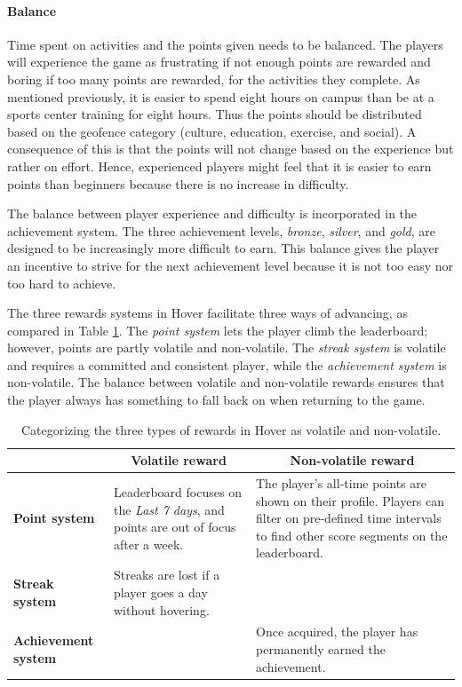 \paragraph*{Balance} 
Time spent on activities and the points given needs to be balanced. The players will experience the game as frustrating if not enough points are rewarded and boring if too many points are rewarded, for the activities they complete. As mentioned previously, it is easier to spend eight hours on campus than be at a sports center training for eight hours. Thus the points should be distributed based on the geofence category (culture, education, exercise, and social). A consequence of this is that the points will not change based on the experience but rather on effort. Hence, experienced players might feel that it is easier to earn points than beginners because there is no increase in difficulty.

The balance between player experience and difficulty is incorporated in the achievement system. The three achievement levels, \textit{bronze}, \textit{silver}, and \textit{gold}, are designed to be increasingly more difficult to earn. This balance gives the player an incentive to strive for the next achievement level because it is not too easy nor too hard to achieve. 

The three rewards systems in Hover facilitate three ways of advancing, as compared in Table \ref{tab:rewardsystems_balance}. The \textit{point system} lets the player climb the leaderboard; however, points are partly volatile and non-volatile. The \textit{streak system} is volatile and requires a committed and consistent player, while the \textit{achievement system} is non-volatile. The balance between volatile and non-volatile rewards ensures that the player always has something to fall back on when returning to the game.

\begin{table}[H]
    \centering
    {\renewcommand{\arraystretch}{2}%
    \begin{tabular}{| p{} | p{} | p{} |}
        \hline
        \multicolumn{1}{|l|}{}   & \multicolumn{1}{c|}{\textbf{Volatile reward}} & \multicolumn{1}{c|}{\textbf{Non-volatile reward}} \\ \hline
        \textbf{Point system}    & Leaderboard focuses on the \textit{Last 7 days}, and points are out of focus after a week. & The player’s all-time points are shown on their profile. Players can filter on pre-defined time intervals to find other score segments on the leaderboard. \\ \hline
        \textbf{Streak system}   & Streaks are lost if a player goes a day without hovering.     &   \\ \hline
        \textbf{\small Achievement system} &     & Once acquired, the player has permanently earned the achievement.   \\ \hline
    \end{tabular}}
    \caption[Categorizing the three types of rewards in Hover.]{Categorizing the three types of rewards in Hover as volatile and non-volatile.}
    \label{tab:rewardsystems_balance}
    \vspace*{-0.5\baselineskip}
\end{table}

